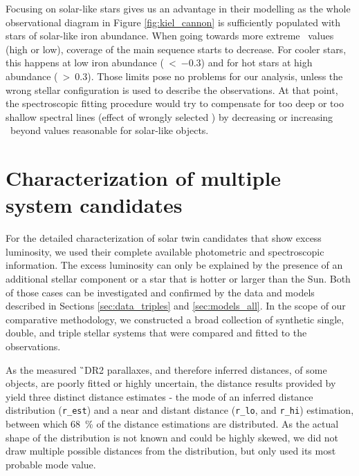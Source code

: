 Focusing on solar-like stars gives us an advantage in their modelling as the whole observational diagram in Figure \ref{fig:kiel_cannon} is sufficiently populated with stars of solar-like iron abundance. When going towards more extreme \Feh\ values (high or low), coverage of the main sequence starts to decrease. For cooler stars, this happens at low iron abundance (\Feh~\textless~$-0.3$) and for hot stars at high abundance (\Feh~\textgreater~$0.3$). Those limits pose no problems for our analysis, unless the wrong stellar configuration is used to describe the observations. At that point, the spectroscopic fitting procedure would try to compensate for too deep or too shallow spectral lines (effect of wrongly selected \Teff) by decreasing or increasing \Feh\ beyond values reasonable for solar-like objects. 

\section{Characterization of multiple system candidates}
\label{sec:multi_fit}
For the detailed characterization of solar twin candidates that show excess luminosity, we used their complete available photometric and spectroscopic information. The excess luminosity can only be explained by the presence of an additional stellar component or a star that is hotter or larger than the Sun. Both of those cases can be investigated and confirmed by the data and models described in Sections \ref{sec:data_triples} and \ref{sec:models_all}. In the scope of our comparative methodology, we constructed a broad collection of synthetic single, double, and triple stellar systems that were compared and fitted to the observations.

As the measured \G\ DR2 parallaxes, and therefore inferred distances, of some objects, are poorly fitted or highly uncertain, the distance results provided by \citet{2018AJ....156...58B} yield three distinct distance estimates - the mode of an inferred distance distribution (\texttt{r\_est}) and a near and distant distance (\texttt{r\_lo}, and \texttt{r\_hi}) estimation, between which 68~\% of the distance estimations are distributed. As the actual shape of the distribution is not known and could be highly skewed, we did not draw multiple possible distances from the distribution, but only used its most probable mode value.

